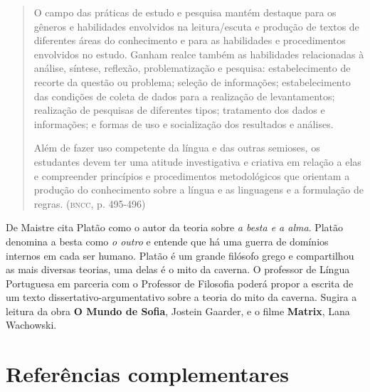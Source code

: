 \documentclass[12pt]{extarticle}
\begin{document}
\begin{quote}
O campo das práticas de estudo e pesquisa mantém destaque para os
gêneros e habilidades envolvidos na leitura/escuta e produção de textos
de diferentes áreas do conhecimento e para as habilidades e
procedimentos envolvidos no estudo. Ganham realce também as habilidades
relacionadas à análise, síntese, reflexão, problematização e pesquisa:
estabelecimento de recorte da questão ou problema; seleção de
informações; estabelecimento das condições de coleta de dados para a
realização de levantamentos; realização de pesquisas de diferentes
tipos; tratamento dos dados e informações; e formas de uso e
socialização dos resultados e análises.

Além de fazer uso competente da língua e das outras semioses, os
estudantes devem ter uma atitude investigativa e criativa em relação a
elas e compreender princípios e procedimentos metodológicos que orientam
a produção do conhecimento sobre a língua e as linguagens e a formulação
de regras. (\textsc{bncc}, p. 495-496)
\end{quote}

De Maistre cita Platão como o autor da teoria sobre \emph{a besta e a
alma}. Platão denomina a besta como \emph{o outro} e entende que há
uma guerra de domínios internos em cada ser humano. Platão é um grande
filósofo grego 
e compartilhou as mais diversas teorias, uma delas é o mito da caverna.
O professor de Língua Portuguesa em parceria com o Professor de
Filosofia poderá propor a escrita de um texto dissertativo-argumentativo
sobre a teoria do mito da caverna. Sugira a leitura da obra \textbf{O
Mundo de Sofia}, Jostein Gaarder, e o filme \textbf{Matrix}, Lana
Wachowski.

\section{Referências complementares}
\end{document}
